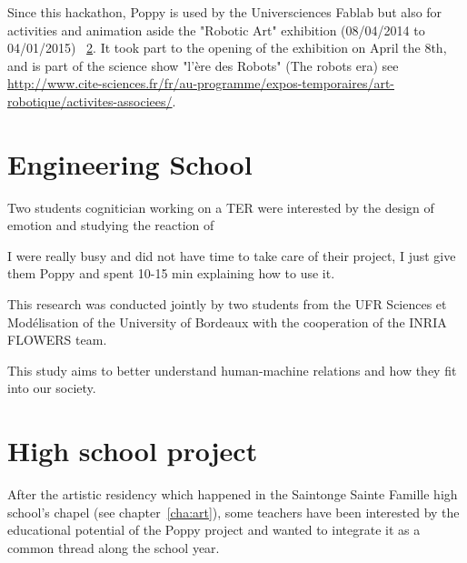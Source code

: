 \begin{figure}[h]
\centering
    \hfil
    \caption{}
    \label{fig:universience_conception}
\end{figure}


Since this hackathon, Poppy is used by the Universciences Fablab but also for activities and animation aside the "Robotic Art" exhibition (08/04/2014 to 04/01/2015) \figurename~\ref{fig:universcience_art}. It took part to the opening of the exhibition on April the 8th, and is part of the science show "l'ère des Robots" (The robots era) see \url{http://www.cite-sciences.fr/fr/au-programme/expos-temporaires/art-robotique/activites-associees/}.

\begin{figure}[]
\centering
    \hfil
    \caption{}
    \label{fig:universcience_art}
\end{figure}


\newpage
\section{Engineering School}

Two students cognitician working on a TER were interested by the design of emotion and studying the reaction of


I were really busy and did not have time to take care of their project, I just give them Poppy and spent 10-15 min explaining how to use it.



This research was conducted jointly by two students from the UFR Sciences et Modélisation of the University of Bordeaux with the cooperation of the INRIA FLOWERS team.

This study aims to better understand human-machine relations and how they fit into our society.


\newpage
\section{High school project} %

After the artistic residency which happened in the Saintonge Sainte Famille high school's chapel (see chapter~\ref{cha:art}), some teachers have been interested by the educational potential of the Poppy project and wanted to integrate it as a common thread along the school year.

